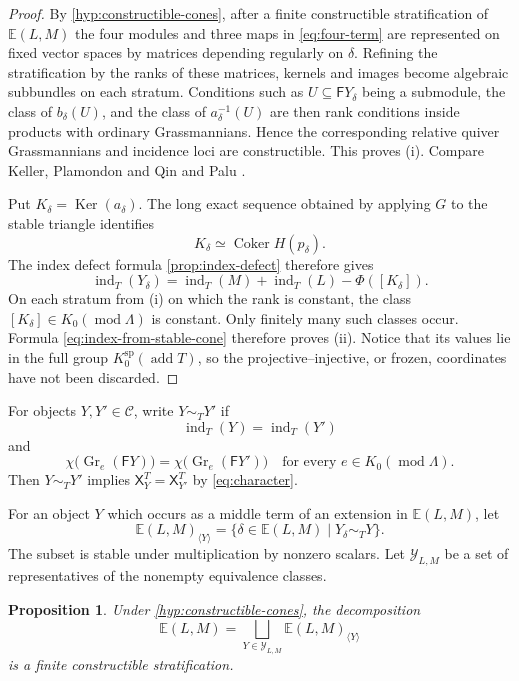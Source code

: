 \documentclass[11pt,reqno]{article}
\numberwithin{equation}{section}
\newtheorem{proposition}[proposition]{Proposition}
\theoremstyle{definition}
\DeclareMathOperator{\add}{add}
\DeclareMathOperator{\Coker}{Coker}
\DeclareMathOperator{\Ker}{Ker}
\DeclareMathOperator{\Gr}{Gr}
\DeclareMathOperator{\ind}{ind}
\DeclareMathOperator{\modu}{mod}
\newcommand{\C}{\mathcal C}
\newcommand{\E}{\mathbb E}
\newcommand{\F}{\mathsf F}
\newcommand{\X}{\mathsf X}
\begin{document}
\begin{proof}
By \cref{hyp:constructible-cones}, after a finite constructible stratification of $\E(L,M)$ the four modules and three maps in \eqref{eq:four-term} are represented on fixed vector spaces by matrices depending regularly on $\delta$.  Refining the stratification by the ranks of these matrices, kernels and images become algebraic subbundles on each stratum.  Conditions such as $U\subseteq\F Y_\delta$ being a submodule, the class of $b_\delta(U)$, and the class of $a_\delta^{-1}(U)$ are then rank conditions inside products with ordinary Grassmannians.  Hence the corresponding relative quiver Grassmannians and incidence loci are constructible.  This proves (i). Compare Keller, Plamondon and Qin \cite[Lemma~2.12]{KellerPlamondonQin} and Palu \cite[Lemma~3.1]{Palu2012}.

Put $K_\delta=\Ker(a_\delta)$.  The long exact sequence obtained by applying $G$ to the stable triangle identifies
\[
 K_\delta\simeq\Coker H(p_\delta).
\]
The index defect formula \cref{prop:index-defect} therefore gives
\begin{equation}\label{eq:index-from-stable-cone}
 \ind_T(Y_\delta)
 =\ind_T(M)+\ind_T(L)-\Phi([K_\delta]).
\end{equation}
On each stratum from (i) on which the rank is constant, the class $[K_\delta]\in K_0(\modu\Lambda)$ is constant. Only finitely many such classes occur.  Formula \eqref{eq:index-from-stable-cone} therefore proves (ii).  Notice that its values lie in the full group $K_0^{\mathrm{sp}}(\add T)$, so the projective--injective, or frozen, coordinates have not been discarded.
\end{proof}


For objects $Y,Y'\in\C$, write $Y\sim_TY'$ if
\[
 \ind_T(Y)=\ind_T(Y')
\]
and
\[
 \chi\bigl(\Gr_e(\F Y)\bigr)
 =\chi\bigl(\Gr_e(\F Y')\bigr)
 \quad\text{for every }e\in K_0(\modu\Lambda).
\]
Then $Y\sim_TY'$ implies $\X^T_Y=\X^T_{Y'}$ by \eqref{eq:character}.

For an object $Y$ which occurs as a middle term of an extension in $\E(L,M)$, let
\[
 \E(L,M)_{\langle Y\rangle}
 =\{\delta\in\E(L,M)\mid Y_\delta\sim_TY\}.
\]
The subset is stable under multiplication by nonzero scalars.  Let $\mathcal Y_{L,M}$ be a set of representatives of the nonempty equivalence classes.

\begin{proposition}\label{prop:stratification}
Under \cref{hyp:constructible-cones}, the decomposition
\[
 \E(L,M)=\bigsqcup_{Y\in\mathcal Y_{L,M}}
 \E(L,M)_{\langle Y\rangle}
\]
is a finite constructible stratification.
\end{proposition}
\end{document}
